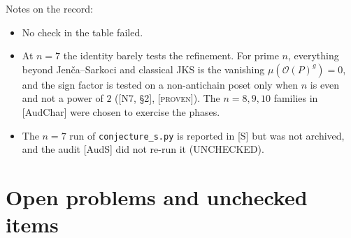 \documentclass[11pt]{article}
\theoremstyle{definition}
\theoremstyle{remark}
\newcommand{\OP}{\mathcal O}
\newcommand{\st}[1]{\textup{[\textsc{#1}]}}
\newcommand{\src}[1]{\nolinkurl{#1}}
\begin{document}
\noindent Notes on the record:
\begin{itemize}[nosep]
\item No check in the table failed.
\item At $n=7$ the identity barely tests the refinement. For prime $n$,
  everything beyond Jen\v{c}a--Sarkoci and classical JKS is the vanishing
  $\mu(\OP(P)^g)=0$, and the sign factor is tested on a non-antichain poset
  only when $n$ is even and not a power of $2$ ([N7, \S2], \st{proven}). The
  $n=8,9,10$ families in [AudChar] were chosen to exercise the phases.
\item The $n=7$ run of \src{conjecture_s.py} is reported in [S] but was not
  archived, and the audit [AudS] did not re-run it (UNCHECKED).
\end{itemize}

\section{Open problems and unchecked items}\label{sec:open}
\end{document}
